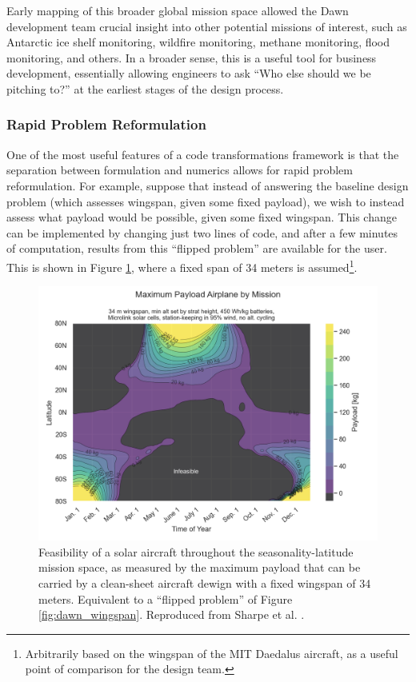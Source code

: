 Early mapping of this broader global mission space allowed the Dawn development team crucial insight into other potential missions of interest, such as Antarctic ice shelf monitoring, wildfire monitoring, methane monitoring, flood monitoring, and others. In a broader sense, this is a useful tool for business development, essentially allowing engineers to ask ``Who else should we be pitching to?'' at the earliest stages of the design process.

\subsubsection*{Rapid Problem Reformulation}

One of the most useful features of a code transformations framework is that the separation between formulation and numerics allows for rapid problem reformulation. For example, suppose that instead of answering the baseline design problem (which assesses wingspan, given some fixed payload), we wish to instead assess what payload would be possible, given some fixed wingspan. This change can be implemented by changing just two lines of code, and after a few minutes of computation, results from this ``flipped problem'' are available for the user. This is shown in Figure \ref{fig:dawn_payload}, where a fixed span of 34 meters is assumed\footnote{Arbitrarily based on the wingspan of the MIT Daedalus aircraft, as a useful point of comparison for the design team.}.

\begin{figure}[h]
    \centering
    \includegraphics[width=\textwidth]{../figures/dawnfigures/max_payload.png}
    \caption{Feasibility of a solar aircraft throughout the seasonality-latitude mission space, as measured by the maximum payload that can be carried by a clean-sheet aircraft dewign with a fixed wingspan of 34 meters. Equivalent to a ``flipped problem'' of Figure \ref{fig:dawn_wingspan}. Reproduced from Sharpe et al. \cite{sharpe_optimization_2021}.}
    \label{fig:dawn_payload}
\end{figure}

